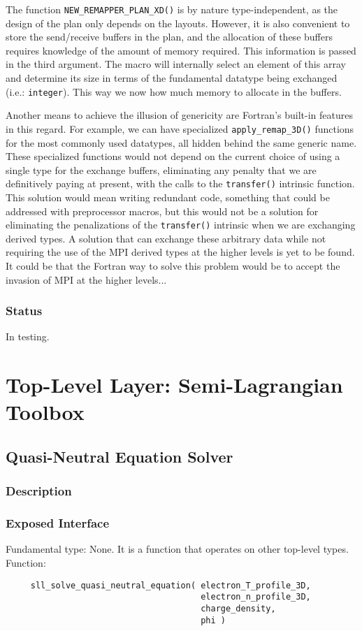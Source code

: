 \documentclass[]{report}   %
\begin{document}
The function \verb+NEW_REMAPPER_PLAN_XD()+ is by nature type-independent, as the design of the plan only depends on the layouts. However, it is also convenient to store the send/receive buffers in the plan, and the allocation of these buffers requires knowledge of the amount of memory required. This information is passed in the third argument. The macro will internally select an element of this array and determine its size in terms of the fundamental datatype being exchanged (i.e.: \verb+integer+). This way we now how much memory to allocate in the buffers.

Another means to achieve the illusion of genericity are Fortran's built-in features in this regard. For example, we can have specialized \verb+apply_remap_3D()+ functions for the most commonly used datatypes, all hidden behind the same generic name. These specialized functions would not depend on the current choice of using a single type for the exchange buffers, eliminating any penalty that we are definitively paying at present, with the calls to the \verb+transfer()+ intrinsic function. This solution would mean writing redundant code, something that could be addressed with preprocessor macros, but this would not be a solution for eliminating the penalizations of the \verb+transfer()+ intrinsic when we are exchanging derived types. A solution that can exchange these arbitrary data while not requiring the use of the MPI derived types at the higher levels is yet to be found. It could be that the Fortran way to solve this problem would be to accept the invasion of MPI at the higher levels...

\subsection{Status}

In testing.


\chapter{Top-Level Layer: Semi-Lagrangian Toolbox}

\section{Quasi-Neutral Equation Solver}
\subsection{Description}
\subsection{Exposed Interface}
Fundamental type: None. It is a function that operates on other top-level types. Function:
\begin{verbatim}
     sll_solve_quasi_neutral_equation( electron_T_profile_3D,
                                       electron_n_profile_3D,
                                       charge_density,
                                       phi )
\end{verbatim}
\end{document}
